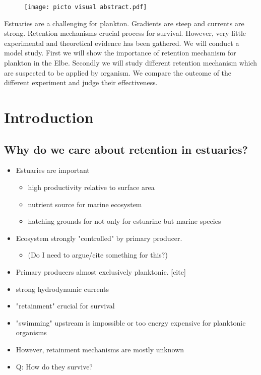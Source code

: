 \begin{figure}
    \texttt{[image: picto visual abstract.pdf]}
\end{figure}
Estuaries are a challenging for plankton.
Gradients are steep and currents are strong.
Retention mechanisms crucial process for survival.
However, very little experimental and theoretical evidence has been gathered.
We will conduct a model study.
First we will show the importance of retention mechanism for plankton in the Elbe.
Secondly we will study different retention mechanism which are suspected to be applied by organism.
We compare the outcome of the different experiment and judge their effectiveness.

\section*{Introduction}

\subsection*{Why do we care about retention in estuaries?}
\begin{itemize}
    \item Estuaries are important
    \begin{itemize}
        \item high productivity relative to surface area
        \item nutrient source for marine ecosystem
        \item hatching grounds for not only for estuarine but marine species
    \end{itemize}
    \item Ecosystem strongly "controlled" by primary producer.
    \begin{itemize}
        \item (Do I need to argue/cite something for this?)
    \end{itemize}
    \item Primary producers almost exclusively planktonic. [cite]
    \item strong hydrodynamic currents %
    \item "retainment" crucial for survival 
    \item "swimming" upstream is impossible or too energy expensive for planktonic organisms
    \item However, retainment mechanisms are mostly unknown
    \item Q: How do they survive?
\end{itemize}

